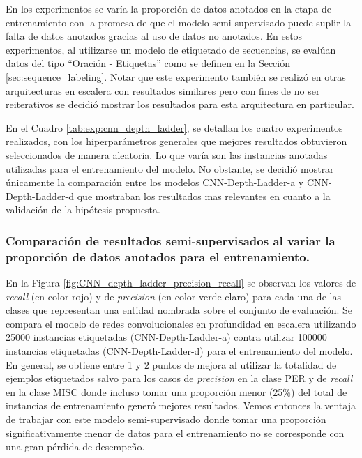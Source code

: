 En los experimentos se varía la proporción de datos anotados en la etapa de entrenamiento con la 
promesa de que el modelo semi-supervisado puede suplir la falta de datos anotados gracias al uso de datos no 
anotados. En estos experimentos, al utilizarse un modelo de etiquetado de secuencias, se evalúan datos
del tipo ``Oración - Etiquetas'' como se definen en la Sección \ref{sec:sequence_labeling}. Notar que este experimento también se realizó en otras arquitecturas en escalera con resultados similares pero con fines de no ser reiterativos se decidió mostrar los resultados para esta arquitectura en particular.

En el Cuadro \ref{tab:exp:cnn_depth_ladder}, se detallan los cuatro experimentos realizados, con los 
hiperparámetros generales que mejores resultados obtuvieron seleccionados de manera aleatoria. Lo que varía 
son las instancias anotadas utilizadas para el entrenamiento del modelo. No obstante, se decidió mostrar únicamente la comparación entre los modelos CNN-Depth-Ladder-a y CNN-Depth-Ladder-d que mostraban los resultados mas relevantes en cuanto a la validación de la hipótesis propuesta.

\subsubsection{Comparación de resultados semi-supervisados al variar la proporción de datos anotados para el entrenamiento.}

En la Figura \ref{fig:CNN_depth_ladder_precision_recall} se observan los valores de \textit{recall} (en color rojo) y de \textit{precision} (en color verde claro) para cada una de las clases que representan una entidad nombrada sobre el conjunto de evaluación. Se compara el modelo de redes convolucionales en profundidad en escalera utilizando 25000 instancias etiquetadas (CNN-Depth-Ladder-a) contra utilizar 100000 instancias etiquetadas (CNN-Depth-Ladder-d) para el entrenamiento del modelo. En general, se obtiene entre 1 y 2 puntos de mejora al utilizar la totalidad de ejemplos etiquetados salvo para los casos de \textit{precision} en la clase PER y de \textit{recall} en la clase MISC donde incluso tomar una proporción menor (25\%) del total de instancias de entrenamiento generó mejores resultados. Vemos entonces la ventaja de trabajar con este modelo semi-supervisado donde tomar una proporción significativamente menor de datos para el entrenamiento no se corresponde con una gran pérdida de desempeño.


